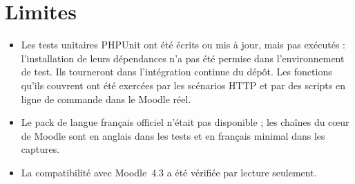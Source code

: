 \documentclass[11pt,a4paper]{article}
\begin{document}
\section{Limites}

\begin{itemize}
  \item Les tests unitaires PHPUnit ont été écrits ou mis à jour, mais pas exécutés : l'installation
    de leurs dépendances n'a pas été permise dans l'environnement de test. Ils tourneront dans
    l'intégration continue du dépôt. Les fonctions qu'ils couvrent ont été exercées par les
    scénarios HTTP et par des scripts en ligne de commande dans le Moodle réel.
  \item Le pack de langue français officiel n'était pas disponible ; les chaînes du cœur de Moodle
    sont en anglais dans les tests et en français minimal dans les captures.
  \item La compatibilité avec Moodle~4.3 a été vérifiée par lecture seulement.
\end{itemize}
\end{document}
